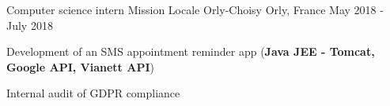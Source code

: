 \begin{cventries}
  \cventry
    {Computer science intern} %
    {Mission Locale Orly-Choisy} %
    {Orly, France} %
    {May 2018 - July 2018} %
    {
      \begin{cvitems} %
        \item {Development of an SMS appointment reminder app (\textbf{Java JEE - Tomcat, Google API, Vianett API})}
        \item {Internal audit of GDPR compliance}
      \end{cvitems}
    }
\end{cventries}

